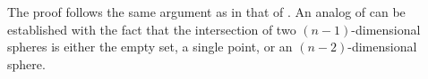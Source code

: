 \documentclass{mystyle}
\begin{document}
The proof  follows the same argument as in that of . An analog of  can be established with the fact that the intersection of two $(n-1)$-dimensional spheres is either the empty set, a single point, or an $(n-2)$-dimensional sphere. 






\end{document}
